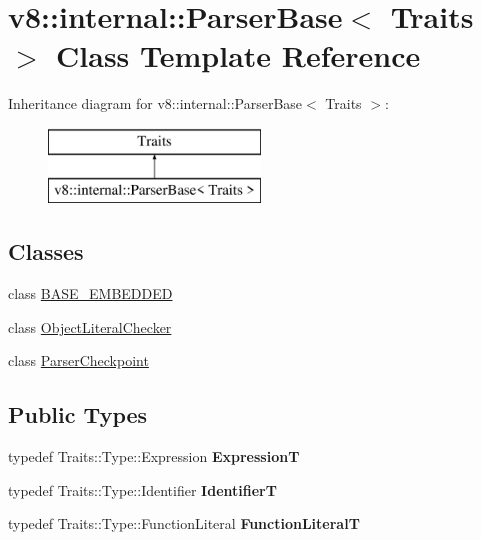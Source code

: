 \hypertarget{classv8_1_1internal_1_1_parser_base}{}\section{v8\+:\+:internal\+:\+:Parser\+Base$<$ Traits $>$ Class Template Reference}
\label{classv8_1_1internal_1_1_parser_base}
Inheritance diagram for v8\+:\+:internal\+:\+:Parser\+Base$<$ Traits $>$\+:\begin{figure}[H]
\begin{center}
\leavevmode
\includegraphics[height=2.000000cm]{classv8_1_1internal_1_1_parser_base}
\end{center}
\end{figure}
\subsection*{Classes}
\begin{DoxyCompactItemize}
\item 
class \hyperlink{classv8_1_1internal_1_1_parser_base_1_1_b_a_s_e___e_m_b_e_d_d_e_d}{B\+A\+S\+E\+\_\+\+E\+M\+B\+E\+D\+D\+E\+D}
\item 
class \hyperlink{classv8_1_1internal_1_1_parser_base_1_1_object_literal_checker}{Object\+Literal\+Checker}
\item 
class \hyperlink{classv8_1_1internal_1_1_parser_base_1_1_parser_checkpoint}{Parser\+Checkpoint}
\end{DoxyCompactItemize}
\subsection*{Public Types}
\begin{DoxyCompactItemize}
\item 
\hypertarget{classv8_1_1internal_1_1_parser_base_a8ed9bb712dc6a4b175ae296f947fd483}{}typedef Traits\+::\+Type\+::\+Expression {\bfseries Expression\+T}\label{classv8_1_1internal_1_1_parser_base_a8ed9bb712dc6a4b175ae296f947fd483}

\item 
\hypertarget{classv8_1_1internal_1_1_parser_base_aba058e9e9fff437ea93b20854533d766}{}typedef Traits\+::\+Type\+::\+Identifier {\bfseries Identifier\+T}\label{classv8_1_1internal_1_1_parser_base_aba058e9e9fff437ea93b20854533d766}

\item 
\hypertarget{classv8_1_1internal_1_1_parser_base_a67ea5acb7eff51938bd594ae43fa005e}{}typedef Traits\+::\+Type\+::\+Function\+Literal {\bfseries Function\+Literal\+T}\label{classv8_1_1internal_1_1_parser_base_a67ea5acb7eff51938bd594ae43fa005e}

\end{DoxyCompactItemize}
